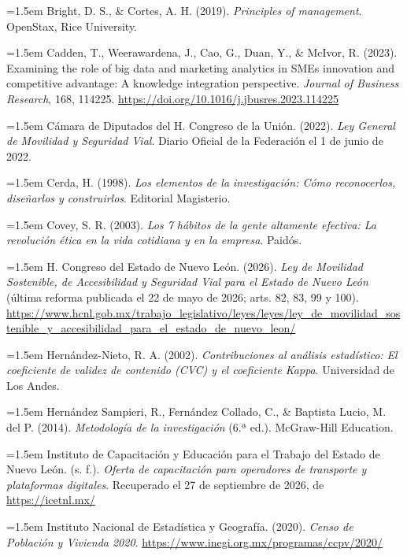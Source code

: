 {\hangindent=1.5em Bright, D. S., \& Cortes, A. H. (2019). \textit{Principles of management}. OpenStax, Rice University.

\hangindent=1.5em Cadden, T., Weerawardena, J., Cao, G., Duan, Y., \& McIvor, R. (2023). Examining the role of big data and marketing analytics in SMEs innovation and competitive advantage: A knowledge integration perspective. \textit{Journal of Business Research}, 168, 114225. \url{https://doi.org/10.1016/j.jbusres.2023.114225}

\hangindent=1.5em Cámara de Diputados del H. Congreso de la Unión. (2022). \textit{Ley General de Movilidad y Seguridad Vial}. Diario Oficial de la Federación el 1 de junio de 2022.

\hangindent=1.5em Cerda, H. (1998). \textit{Los elementos de la investigación: Cómo reconocerlos, diseñarlos y construirlos}. Editorial Magisterio.

\hangindent=1.5em Covey, S. R. (2003). \textit{Los 7 hábitos de la gente altamente efectiva: La revolución ética en la vida cotidiana y en la empresa}. Paidós.

\hangindent=1.5em H. Congreso del Estado de Nuevo León. (2026). \textit{Ley de Movilidad Sostenible, de Accesibilidad y Seguridad Vial para el Estado de Nuevo León} (última reforma publicada el 22 de mayo de 2026; arts. 82, 83, 99 y 100). \url{https://www.hcnl.gob.mx/trabajo_legislativo/leyes/leyes/ley_de_movilidad_sostenible_y_accesibilidad_para_el_estado_de_nuevo_leon/}

\hangindent=1.5em Hernández-Nieto, R. A. (2002). \textit{Contribuciones al análisis estadístico: El coeficiente de validez de contenido (CVC) y el coeficiente Kappa}. Universidad de Los Andes.

\hangindent=1.5em Hernández Sampieri, R., Fernández Collado, C., \& Baptista Lucio, M. del P. (2014). \textit{Metodología de la investigación} (6.ª ed.). McGraw-Hill Education.

\hangindent=1.5em Instituto de Capacitación y Educación para el Trabajo del Estado de Nuevo León. (s. f.). \textit{Oferta de capacitación para operadores de transporte y plataformas digitales}. Recuperado el 27 de septiembre de 2026, de \url{https://icetnl.mx/}

\hangindent=1.5em Instituto Nacional de Estadística y Geografía. (2020). \textit{Censo de Población y Vivienda 2020}. \url{https://www.inegi.org.mx/programas/ccpv/2020/}

}
